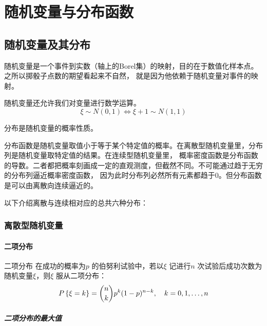 \chapter{随机变量与分布函数}
\section{随机变量及其分布}
随机变量是一个事件到实数（轴上的Borel集）的映射，目的在于数值化样本点。之所以掷骰子点数的期望看起来不自然，
就是因为他依赖于随机变量对事件的映射。

随机变量还允许我们对变量进行数学运算。\[
    \xi \sim N(0,1) \iff \xi+1 \sim N(1,1)
\]

分布是随机变量的概率性质。

分布函数是随机变量取值小于等于某个特定值的概率。在离散型随机变量里，分布列是随机变量取特定值的结果。在连续型随机变量里，
概率密度函数是分布函数的导数。二者都把概率刻画成一定的直观测度，但截然不同。不可能通过趋于无穷的分布列逼近概率密度函数，
因为此时分布列必然所有元素都趋于0。但分布函数是可以由离散向连续逼近的。

以下介绍离散与连续相对应的总共六种分布：

\subsection{离散型随机变量}

\subsubsection{二项分布}
\begin{definition}{二项分布}
    在成功的概率为\(p\) 的伯努利试验中，若以\(\xi\) 记进行\(n\)
    次试验后成功次数为随机变量\(\xi\)，则\(\xi\) 服从二项分布：
    \[
        \P{\xi=k} = \binom{n}{k} p^{k} (1-p)^{n-k}, \quad k=0,1,\ldots,n
    \]
\end{definition}

\paragraph{二项分布的最大值}

